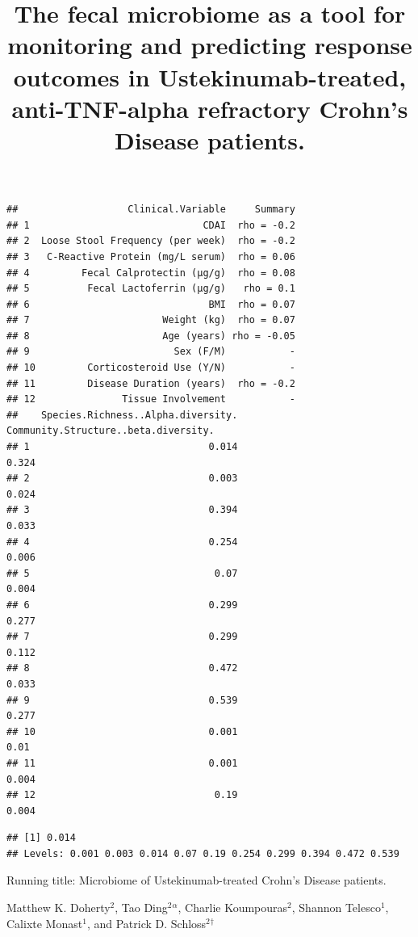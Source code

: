 \documentclass[11pt,]{article}
\title{The fecal microbiome as a tool for monitoring and predicting response
outcomes in Ustekinumab-treated, anti-TNF-alpha refractory Crohn's
Disease patients.}
\author{}
\date{}
\begin{document}
\maketitle

\begin{verbatim}
##                   Clinical.Variable     Summary
## 1                              CDAI  rho = -0.2
## 2  Loose Stool Frequency (per week)  rho = -0.2
## 3   C-Reactive Protein (mg/L serum)  rho = 0.06
## 4         Fecal Calprotectin (µg/g)  rho = 0.08
## 5          Fecal Lactoferrin (µg/g)   rho = 0.1
## 6                               BMI  rho = 0.07
## 7                       Weight (kg)  rho = 0.07
## 8                       Age (years) rho = -0.05
## 9                         Sex (F/M)           -
## 10         Corticosteroid Use (Y/N)           -
## 11         Disease Duration (years)  rho = -0.2
## 12               Tissue Involvement           -
##    Species.Richness..Alpha.diversity. Community.Structure..beta.diversity.
## 1                               0.014                                0.324
## 2                               0.003                                0.024
## 3                               0.394                                0.033
## 4                               0.254                                0.006
## 5                                0.07                                0.004
## 6                               0.299                                0.277
## 7                               0.299                                0.112
## 8                               0.472                                0.033
## 9                               0.539                                0.277
## 10                              0.001                                 0.01
## 11                              0.001                                0.004
## 12                               0.19                                0.004
\end{verbatim}

\begin{verbatim}
## [1] 0.014
## Levels: 0.001 0.003 0.014 0.07 0.19 0.254 0.299 0.394 0.472 0.539
\end{verbatim}

\vspace{35mm}

Running title: Microbiome of Ustekinumab-treated Crohn's Disease
patients.

\vspace{35mm} Matthew K. Doherty\({^2}\), Tao Ding\({^2}\)\({^\alpha}\),
Charlie Koumpouras\({^2}\), Shannon Telesco\({^1}\), Calixte
Monast\({^1}\), and Patrick D. Schloss\({^2}\)\({^\dagger}\)
\end{document}

